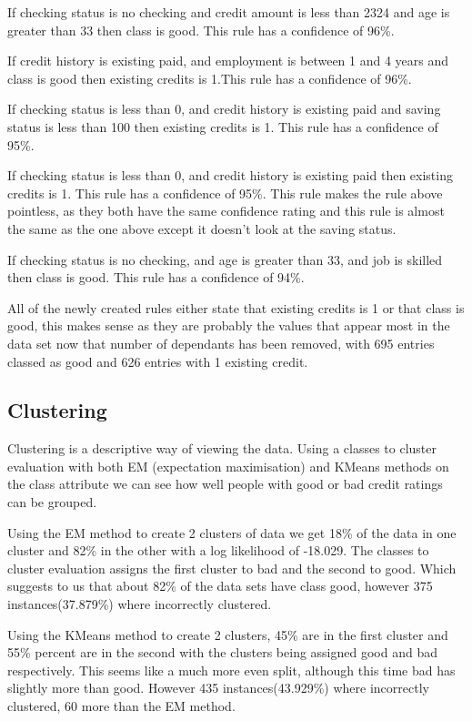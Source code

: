 \documentclass[12pt, a4paper]{article}
\begin{document}
	If checking status is no checking and credit amount is less than 2324 and age is greater than 33 then class is good. This rule has a confidence of 96\%.
	
	If credit history is existing paid, and employment is between 1 and 4 years and class is good then existing credits is 1.This rule has a confidence of 96\%.
	
	If checking status is less than 0, and credit history is existing paid and saving status is less than 100 then existing credits is 1. This rule has a confidence of 95\%.
	
	If checking status is less than 0, and credit history is existing paid then existing credits is 1. This rule has a confidence of 95\%. This rule makes the rule above pointless, as they both have the same confidence rating and this rule is almost the same as the one above except it doesn't look at the saving status.
	
	If checking status is no checking, and age is greater than 33, and job is skilled then class is good. This rule has a confidence of 94\%.
	
	All of the newly created rules either state that existing credits is 1 or that class is good, this makes sense as they are probably the values that appear most in the data set now that number of dependants has been removed, with 695 entries classed as good and 626 entries with 1 existing credit.
		
	\subsection{Clustering}
	Clustering is a descriptive way of viewing the data. Using a classes to cluster evaluation with both EM (expectation maximisation) and KMeans methods on the class attribute we can see how well people with good or bad credit ratings can be grouped. 
	
	Using the EM method to create 2 clusters of data we get 18\% of the data in one cluster and 82\% in the other with a log likelihood of -18.029. The classes to cluster evaluation assigns the first cluster to bad and the second to good. Which suggests to us that about 82\% of the data sets have class good, however 375 instances(37.879\%) where incorrectly clustered.
		
	Using the KMeans method to create 2 clusters, 45\% are in the first cluster and 55\% percent are in the second with the clusters being assigned good and bad respectively. This seems like a much more even split, although this time bad has slightly more than good. However 435 instances(43.929\%) where incorrectly clustered, 60 more than the EM method.
	
\end{document}
